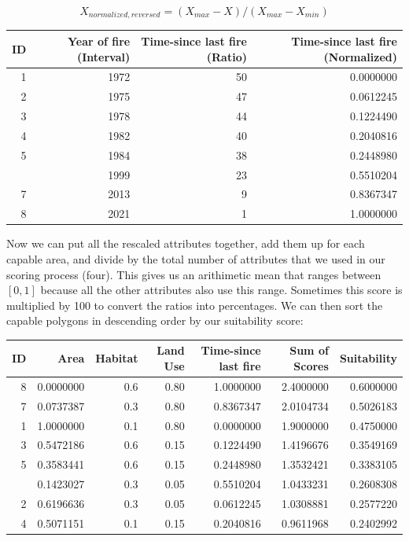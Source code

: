 \documentclass[
]{book}
\begin{document}
\[
X_{normalized,reversed} = (X_{max}-X)/(X_{max}-X_{min})
\]

\begin{tabular}{rrrr}
\toprule
ID & Year of fire (Interval) & Time-since last fire (Ratio) & Time-since last fire (Normalized)\\
\midrule
1 & 1972 & 50 & 0.0000000\\
2 & 1975 & 47 & 0.0612245\\
3 & 1978 & 44 & 0.1224490\\
4 & 1982 & 40 & 0.2040816\\
5 & 1984 & 38 & 0.2448980\\
\addlinespace
6 & 1999 & 23 & 0.5510204\\
7 & 2013 & 9 & 0.8367347\\
8 & 2021 & 1 & 1.0000000\\
\bottomrule
\end{tabular}

Now we can put all the rescaled attributes together, add them up for each capable area, and divide by the total number of attributes that we used in our scoring process (four). This gives us an arithimetic mean that ranges between \([0,1]\) because all the other attributes also use this range. Sometimes this score is multiplied by 100 to convert the ratios into percentages. We can then sort the capable polygons in descending order by our suitability score:

\begin{tabular}{rrrrrrr}
\toprule
ID & Area & Habitat & Land Use & Time-since last fire & Sum of Scores & Suitability\\
\midrule
8 & 0.0000000 & 0.6 & 0.80 & 1.0000000 & 2.4000000 & 0.6000000\\
7 & 0.0737387 & 0.3 & 0.80 & 0.8367347 & 2.0104734 & 0.5026183\\
1 & 1.0000000 & 0.1 & 0.80 & 0.0000000 & 1.9000000 & 0.4750000\\
3 & 0.5472186 & 0.6 & 0.15 & 0.1224490 & 1.4196676 & 0.3549169\\
5 & 0.3583441 & 0.6 & 0.15 & 0.2448980 & 1.3532421 & 0.3383105\\
\addlinespace
6 & 0.1423027 & 0.3 & 0.05 & 0.5510204 & 1.0433231 & 0.2608308\\
2 & 0.6196636 & 0.3 & 0.05 & 0.0612245 & 1.0308881 & 0.2577220\\
4 & 0.5071151 & 0.1 & 0.15 & 0.2040816 & 0.9611968 & 0.2402992\\
\bottomrule
\end{tabular}
\end{document}
